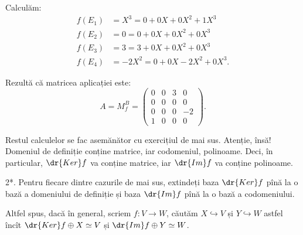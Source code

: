 Calculăm:
\begin{align*}
    f(E_1) &= X^3 = 0 + 0X + 0X^2 + 1X^3 \\
    f(E_2) &= 0 = 0 + 0X + 0X^2 + 0X^3 \\
    f(E_3) &= 3 = 3 + 0X + 0X^2 + 0X^3 \\
    f(E_4) &= -2X^2 = 0 + 0X - 2X^2 + 0X^3.
\end{align*}

Rezultă că matricea aplicației este:
\[
      A = M_f^B = %
      \begin{pmatrix}
          0 & 0 & 3 & 0 \\
          0 & 0 & 0 & 0 \\
          0 & 0 & 0 & -2 \\
          1 & 0 & 0 & 0
      \end{pmatrix}.
\]

Restul calculelor se fac asemănător cu exercițiul de mai sus. Atenție, însă! Domeniul de definiție
conține matrice, iar codomeniul, polinoame. Deci, în particular, $ \dr{Ker}f $ va conține
matrice, iar $ \dr{Im}f $ va conține polinoame.


\vspace{1cm}

2*. Pentru fiecare dintre cazurile de mai sus, extindeți baza $ \dr{Ker}f $ pînă la o bază
a domeniului de definiție și baza $ \dr{Im}f $ pînă la o bază a codomeniului.

Altfel spus, dacă în general, scriem $ f : V \to W $, căutăm $ X \hookrightarrow V $ și
$ Y \hookrightarrow W $ astfel încît $ \dr{Ker}f \oplus X \simeq V $ și $ \dr{Im}f \oplus Y \simeq W $.

